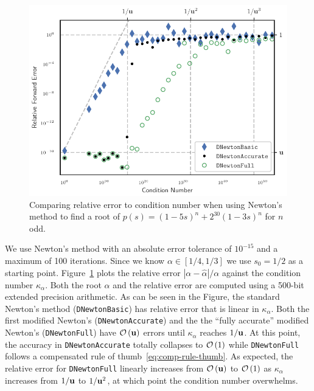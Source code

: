 \begin{figure}
  \includegraphics{../images/compensated-newton/newton_de_casteljau.pdf}
  \centering
  \captionsetup{width=.75\linewidth}
  \caption{Comparing relative error to condition number when using Newton's
    method to find a root of \(p(s) = (1 - 5s)^n + 2^{30} (1 - 3s)^n\) for
    \(n\) odd.}
  \label{fig:newton-de-casteljau-1d}
\end{figure}

We use Newton's method with an absolute error tolerance of \(10^{-15}\)
and a maximum of 100 iterations. Since we know
\(\alpha \in \left[1/4, 1/3\right]\) we use \(s_0 = 1/2\) as a starting
point. Figure~\ref{fig:newton-de-casteljau-1d} plots the relative error
\(\left|\alpha - \widehat{\alpha}\right| / \alpha\) against the condition
number \(\kappa_{\alpha}\). Both the root \(\alpha\) and the relative error
are computed using a 500-bit extended precision arithmetic. As can be
seen in the Figure, the standard Newton's method (\texttt{DNewtonBasic})
has relative error that is linear in \(\kappa_{\alpha}\). Both
the first modified Newton's (\texttt{DNewtonAccurate}) and the
the ``fully accurate'' modified Newton's (\texttt{DNewtonFull}) have
\(\mathcal{O}\left(\mathbf{u}\right)\) errors until \(\kappa_{\alpha}\) reaches
\(1 / \mathbf{u}\). At this point, the accuracy in \texttt{DNewtonAccurate}
totally collapses to \(\mathcal{O}\left(1\right)\) while \texttt{DNewtonFull} follows
a compensated rule of thumb~\eqref{eq:comp-rule-thumb}. As expected, the
relative error for \texttt{DNewtonFull} linearly increases from
\(\mathcal{O}\left(\mathbf{u}\right)\) to \(\mathcal{O}\left(1\right)\) as \(\kappa_{\alpha}\) increases from
\(1 / \mathbf{u}\) to \(1 / \mathbf{u}^2\), at which point the condition number
overwhelms.


